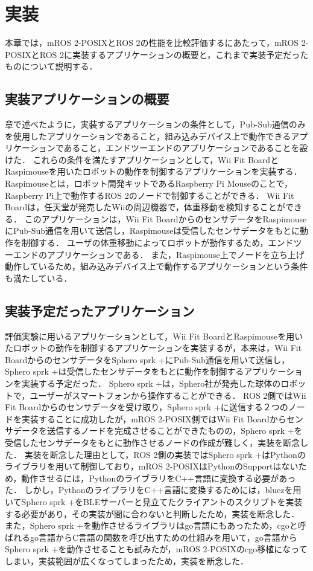 \chapter{実装}
\label{chap:implementation}
本章では，mROS 2-POSIXとROS 2の性能を比較評価するにあたって，mROS 2-POSIXとROS 2に実装するアプリケーションの概要と，これまで実装予定だったものについて説明する．
\section{実装アプリケーションの概要}
\label{chap:evaluation}章で述べたように，実装するアプリケーションの条件として，Pub-Sub通信のみを使用したアプリケーションであること，組み込みデバイス上で動作できるアプリケーションであること，エンドツーエンドのアプリケーションであることを設けた．
これらの条件を満たすアプリケーションとして，Wii Fit BoardとRaspimouseを用いたロボットの動作を制御するアプリケーションを実装する．
Raspimouseとは，ロボット開発キットであるRaspberry Pi Mouseのことで，Raspberry Pi上で動作するROS 2のノードで制御することができる．
Wii Fit Boardは，任天堂が発売したWiiの周辺機器で，体重移動を検知することができる．
このアプリケーションは，Wii Fit BoardからのセンサデータをRaspimouseにPub-Sub通信を用いて送信し，Raspimouseは受信したセンサデータをもとに動作を制御する．
ユーザの体重移動によってロボットが動作するため，エンドツーエンドのアプリケーションである．
また，Raspimouse上でノードを立ち上げ動作しているため，組み込みデバイス上で動作するアプリケーションという条件も満たしている．
\section{実装予定だったアプリケーション}
評価実験に用いるアプリケーションとして，Wii Fit BoardとRaspimouseを用いたロボットの動作を制御するアプリケーションを実装するが，本来は，Wii Fit BoardからのセンサデータをSphero sprk +にPub-Sub通信を用いて送信し，Sphero sprk +は受信したセンサデータをもとに動作を制御するアプリケーションを実装する予定だった．
Sphero sprk +は，Sphero社が発売した球体のロボットで，ユーザーがスマートフォンから操作することができる．
ROS 2側ではWii Fit Boardからのセンサデータを受け取り，Sphero sprk +に送信する２つのノードを実装することに成功したが，mROS 2-POSIX側ではWii Fit Boardからセンサデータを送信するノードを完成させることができたものの，Sphero sprk +を受信したセンサデータをもとに動作させるノードの作成が難しく，実装を断念した．
実装を断念した理由として，ROS 2側の実装ではSphero sprk +はPythonのライブラリを用いて制御しており，mROS 2-POSIXはPythonのSupportはないため，動作させるには，PythonのライブラリをC++言語に変換する必要があった．
しかし，PythonのライブラリをC++言語に変換するためには，bluezを用いてSphero sprk +をBLEサーバーと見立てたクライアントのスクリプトを実装する必要があり，その実装が間に合わないと判断したため，実装を断念した．
また，Sphero sprk +を動作させるライブラリはgo言語にもあったため，cgoと呼ばれるgo言語からC言語の関数を呼び出すための仕組みを用いて，go言語からSphero sprk +を動作させることも試みたが，mROS 2-POSIXのcgo移植になってしまい，実装範囲が広くなってしまったため，実装を断念した．

